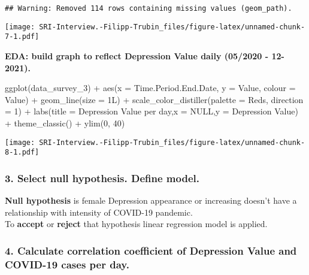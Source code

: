 \documentclass[
]{article}
\newenvironment{Shaded}{\begin{snugshade}}{\end{snugshade}}
\newcommand{\AttributeTok}[1]{\textcolor[rgb]{0.77,0.63,0.00}{#1}}
\newcommand{\ConstantTok}[1]{\textcolor[rgb]{0.00,0.00,0.00}{#1}}
\newcommand{\DecValTok}[1]{\textcolor[rgb]{0.00,0.00,0.81}{#1}}
\newcommand{\FunctionTok}[1]{\textcolor[rgb]{0.00,0.00,0.00}{#1}}
\newcommand{\NormalTok}[1]{#1}
\newcommand{\SpecialCharTok}[1]{\textcolor[rgb]{0.00,0.00,0.00}{#1}}
\newcommand{\StringTok}[1]{\textcolor[rgb]{0.31,0.60,0.02}{#1}}
\begin{document}
\begin{verbatim}
## Warning: Removed 114 rows containing missing values (geom_path).
\end{verbatim}

\texttt{[image: SRI-Interview.-Filipp-Trubin\_files/figure-latex/unnamed-chunk-7-1.pdf]}

\textbf{EDA: build graph to reflect Depression Value daily (05/2020 -
12-2021).}

\begin{Shaded}
\begin{Highlighting}[]
\FunctionTok{ggplot}\NormalTok{(data\_survey\_3) }\SpecialCharTok{+}
  \FunctionTok{aes}\NormalTok{(}\AttributeTok{x =}\NormalTok{ Time.Period.End.Date, }\AttributeTok{y =}\NormalTok{ Value, }\AttributeTok{colour =}\NormalTok{ Value) }\SpecialCharTok{+}
  \FunctionTok{geom\_line}\NormalTok{(}\AttributeTok{size =}\NormalTok{ 1L) }\SpecialCharTok{+}
  \FunctionTok{scale\_color\_distiller}\NormalTok{(}\AttributeTok{palette =} \StringTok{\textquotesingle{}Reds\textquotesingle{}}\NormalTok{, }\AttributeTok{direction =} \DecValTok{1}\NormalTok{) }\SpecialCharTok{+}
  \FunctionTok{labs}\NormalTok{(}\AttributeTok{title =} \StringTok{\textquotesingle{}Depression Value per day\textquotesingle{}}\NormalTok{,}\AttributeTok{x =} \ConstantTok{NULL}\NormalTok{,}\AttributeTok{y =} \StringTok{\textquotesingle{}Depression Value\textquotesingle{}}\NormalTok{) }\SpecialCharTok{+}
  \FunctionTok{theme\_classic}\NormalTok{() }\SpecialCharTok{+}
  \FunctionTok{ylim}\NormalTok{(}\DecValTok{0}\NormalTok{, }\DecValTok{40}\NormalTok{)}
\end{Highlighting}
\end{Shaded}

\texttt{[image: SRI-Interview.-Filipp-Trubin\_files/figure-latex/unnamed-chunk-8-1.pdf]}

\hypertarget{select-null-hypothesis.-define-model.}{%
\subsubsection{3. Select null hypothesis. Define
model.}\label{select-null-hypothesis.-define-model.}}

\textbf{Null hypothesis} is female Depression appearance or increasing
doesn't have a relationship with intensity of COVID-19 pandemic.\\
To \textbf{accept} or \textbf{reject} that hypothesis linear regression
model is applied.

\hypertarget{calculate-correlation-coefficient-of-depression-value-and-covid-19-cases-per-day.}{%
\subsubsection{4. Calculate correlation coefficient of Depression Value
and COVID-19 cases per
day.}\label{calculate-correlation-coefficient-of-depression-value-and-covid-19-cases-per-day.}}
\end{document}
